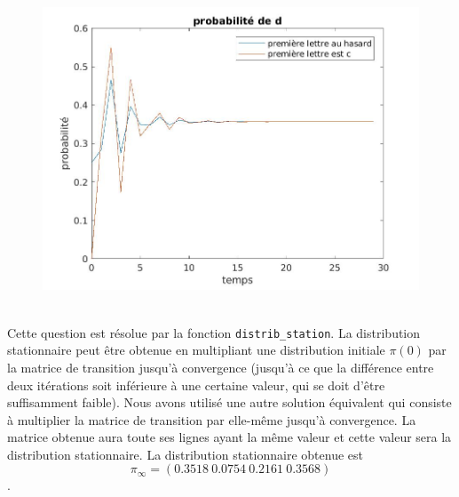 \documentclass[11pt]{report}
\begin{document}
\begin{figure}[!h]
\begin{center}
\includegraphics[height = 9cm]{prob_d.jpg}
\caption{\label{prob_d}}
\end{center}
\end{figure}
\subsubsection{}
Cette question est résolue par la fonction \texttt{distrib\_station}. La distribution stationnaire peut être obtenue en multipliant une distribution initiale $\pi(0)$ par la matrice de transition jusqu'à convergence (jusqu'à ce que la différence entre deux itérations soit inférieure à une certaine valeur, qui se doit d'être suffisamment faible). Nous avons utilisé une autre solution équivalent qui consiste à multiplier la matrice de transition par elle-même jusqu'à convergence. La matrice obtenue aura toute ses lignes ayant la même valeur et cette valeur sera la distribution stationnaire.
La distribution stationnaire obtenue est 
$$\pi_{\infty} = (0.3518\ 0.0754\ 0.2161\ 0.3568)$$.
\end{document}
